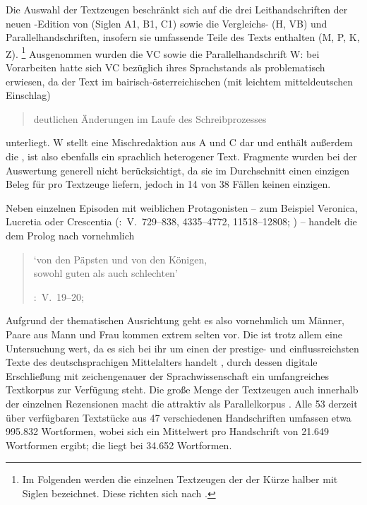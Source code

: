 Die Auswahl der Textzeugen beschränkt sich auf die drei
Leithandschriften der neuen \KC{}-Edition von
\citeauthor{chincaetal2019b} (Siglen A1, B1, C1) sowie die Vergleichs- (H, VB)
und Parallelhandschriften, insofern sie umfassende Teile des
Texts enthalten (M, P, K, Z).%
%
	\footnote{Im Folgenden werden die einzelnen Textzeugen der \KC{} der
	Kürze halber mit Siglen bezeichnet. Diese richten sich nach
	 \autocite{kcdigital}.}
%
Ausgenommen wurden die  VC sowie die
Parallelhandschrift W: bei Vorarbeiten hatte sich VC bezüglich
ihres Sprachstands als problematisch erwiesen, da der Text im
bairisch-österreichischen  (mit leichtem
mitteldeutschen Einschlag)
\blockcquote[73]{wolf:kckat}{deutlichen Änderungen im Laufe des
Schreibprozesses} unterliegt. W stellt eine Mischredaktion aus A und C dar und
enthält außerdem die 
\autocite[48--54]{weis2022}, ist also ebenfalls ein sprachlich heterogener
Text. Fragmente wurden bei der Auswertung generell nicht berücksichtigt, da sie
im Durchschnitt einen einzigen Beleg für  pro Textzeuge liefern,
jedoch in 14 von 38 Fällen keinen einzigen.

Neben einzelnen Episoden mit weiblichen Protagonisten -- zum Beispiel Veronica,
Lucretia oder Crescentia (\KC:~V.~729--838, 4335--4772, 11518--12808;
\cite[vgl.][94--96, 161--169, 292--314]{schroeder1895}) -- handelt die \KC{} dem
Prolog nach vornehmlich

\blockquote[{\KC:~V.~19--20; \cite[79]{schroeder1895}}]{

	`von den Päpsten und von den Königen,\\
	sowohl guten als auch schlechten'
}

Aufgrund der thematischen Ausrichtung geht es also vornehmlich um Männer, Paare
aus Mann und Frau kommen extrem selten vor. Die \KC{} ist trotz allem eine
Untersuchung wert, da es sich bei ihr um einen der prestige- und
einflussreichsten Texte des deutschsprachigen Mittelalters handelt
\autocite[93]{wolf2008}, durch dessen digitale Erschließung mit zeichengenauer
 \autocite{kcdigital} der Sprachwissenschaft ein
umfangreiches Textkorpus zur Verfügung steht. Die große Menge der
Textzeugen auch innerhalb der einzelnen Rezensionen macht die \KC{} attraktiv
als Parallelkorpus \autocite{cysouwwaelchli2007}. Alle 53
derzeit über  verfügbaren Textstücke aus 47 verschiedenen
Handschriften umfassen etwa 995.832 Wortformen, wobei sich ein Mittelwert pro
Handschrift von 21.649 Wortformen ergibt; die  liegt
bei 34.652 Wortformen.

